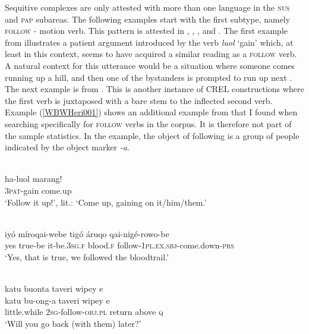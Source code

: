 Sequitive complexes are only attested with more than one language in the \textsc{nus} and \textsc{pap} subareas. The following examples start with the first subtype, namely \textsc{follow} - motion verb. This pattern is attested in , , , and . The first example from  illustrates a patient argument introduced by the verb \textit{luol} `gain' which, at least in this context, seems to have acquired a similar reading as a \textsc{follow} verb. A natural context for this utterance would be a situation where someone comes running up a hill, and then one of the bystanders is prompted to run up next \citep[362]{kratochvil2007grammar}. The next example is from . This is another instance of  CREL constructions where the first verb is juxtaposed with a bare stem to the inflected second verb. Example (\ref{WBWHeri001}) shows an additional example from  that I found when searching specifically for \textsc{follow} verbs in the  corpus. It is therefore not part of the sample statistics. In the  example, the object of following is a group of people indicated by the object marker \textit{-a}.

\ea \label{Abui059}
\\
\gll ha-luol marang! \\
\textsc{3}\textsc{pat}-gain come.up \\
\glft `Follow it up!’, lit.: `Come up, gaining on it/him/them.’ \\ 
\z

\ea \label{Inanwatan026}
\\
\gll iyó míroqai-webe tigó áruqo qai-nigé-rowo-be \\
yes true-be it-be.\textsc{3}\textsc{sg}.\textsc{f} blood.\textsc{f} follow-\textsc{1}\textsc{pl}.\textsc{ex}.\textsc{sbj}-come.down-\textsc{prs} \\
\glft `Yes, that is true, we followed the bloodtrail.'\\ 
\z

\ea \label{WBWHeri001}
\\
\glll katu buonta taveri wipey e \\
katu bu-ong-a taveri wipey e \\
little.while \textsc{2}\textsc{sg}-follow-\textsc{obj}.\textsc{pl} return above \textsc{q} \\
\glft `Will you go back (with them) later?' \\ 
\z

